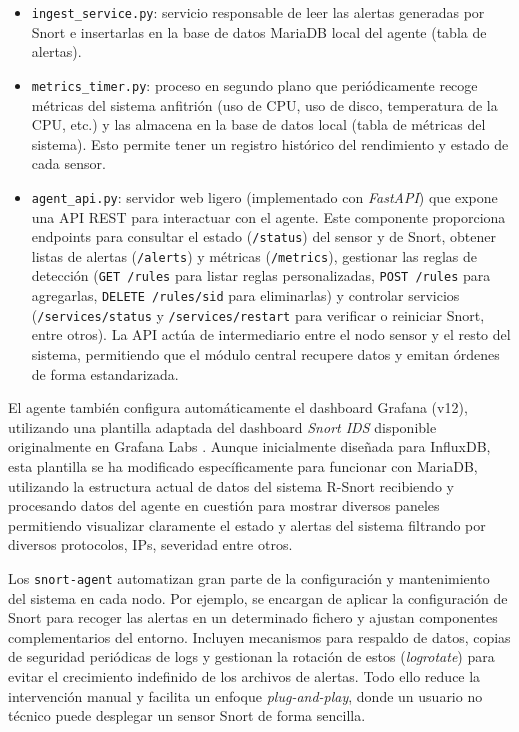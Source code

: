 \documentclass[11pt,a4paper,twoside]{report}
\begin{document}
\begin{itemize}
	\item \texttt{ingest\_service.py}: servicio responsable de leer las alertas generadas por Snort e insertarlas en la base de datos MariaDB local del agente (tabla de alertas).
	\item \texttt{metrics\_timer.py}: proceso en segundo plano que periódicamente recoge métricas del sistema anfitrión (uso de CPU, uso de disco, temperatura de la CPU, etc.) y las almacena en la base de datos local (tabla de métricas del sistema). Esto permite tener un registro histórico del rendimiento y estado de cada sensor.
	\item \texttt{agent\_api.py}: servidor web ligero (implementado con \textit{FastAPI}) que expone una API REST para interactuar con el agente. Este componente proporciona endpoints para consultar el estado (\texttt{/status}) del sensor y de Snort, obtener listas de alertas (\texttt{/alerts}) y métricas (\texttt{/metrics}), gestionar las reglas de detección (\texttt{GET /rules} para listar reglas personalizadas, \texttt{POST /rules} para agregarlas, \texttt{DELETE /rules/{sid}} para eliminarlas) y controlar servicios (\texttt{/services/status} y \texttt{/services/restart} para verificar o reiniciar Snort, entre otros). La API actúa de intermediario entre el nodo sensor y el resto del sistema, permitiendo que el módulo central recupere datos y emitan órdenes de forma estandarizada.
\end{itemize}

El agente también configura automáticamente el dashboard Grafana (v12), utilizando una plantilla adaptada del dashboard \textit{Snort IDS} disponible originalmente en Grafana Labs \cite{grafana-snort-dashboard}. Aunque inicialmente diseñada para InfluxDB, esta plantilla se ha modificado específicamente para funcionar con MariaDB, utilizando la estructura actual de datos del sistema R-Snort recibiendo y procesando datos del agente en cuestión para mostrar diversos paneles permitiendo visualizar claramente el estado y alertas del sistema filtrando por diversos protocolos, IPs, severidad entre otros.\newline

Los \texttt{snort-agent} automatizan gran parte de la configuración y mantenimiento del sistema en cada nodo. Por ejemplo, se encargan de aplicar la configuración de Snort para recoger las alertas en un determinado fichero y ajustan componentes complementarios del entorno. Incluyen mecanismos para respaldo de datos, copias de seguridad periódicas de logs y gestionan la rotación de estos (\emph{logrotate}) para evitar el crecimiento indefinido de los archivos de alertas. Todo ello reduce la intervención manual y facilita un enfoque \emph{plug-and-play}, donde un usuario no técnico puede desplegar un sensor Snort de forma sencilla.\newline
\end{document}
